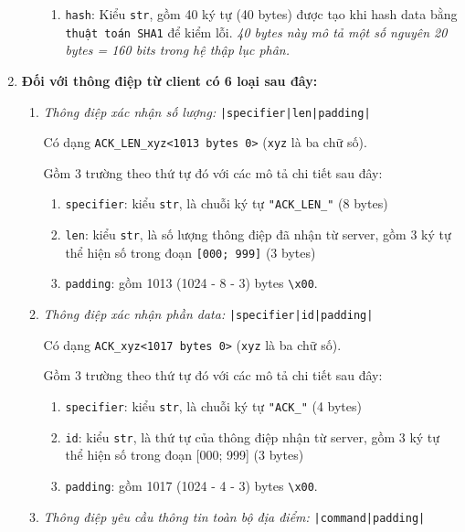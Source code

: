 \begin{enumerate}
\begin{enumerate}
\begin{enumerate}
\item \texttt{hash}: Kiểu \texttt{str}, gồm 40 ký tự (40 bytes) được tạo khi hash data bằng \texttt{thuật toán SHA1} để kiểm lỗi. \textit{40 bytes này mô tả một số nguyên 20 bytes = 160 bits trong hệ thập lục phân.}
\end{enumerate}


\end{enumerate}
\large
\item \textbf{Đối với thông điệp từ client có 6 loại sau đây:}
\normalsize

\begin{enumerate}
\item \textit{Thông điệp xác nhận số lượng:} \texttt{|specifier|len|padding|}

Có dạng \texttt{ACK{\_}LEN{\_}xyz<1013 bytes 0>} (\texttt{xyz} là ba chữ số).

Gồm 3 trường theo thứ tự đó với các mô tả chi tiết sau đây:

\begin{enumerate}
\item \texttt{specifier}: kiểu \texttt{str}, là chuỗi ký tự \texttt{"ACK\_{LEN}\_"} (8 bytes)
\item \texttt{len}: kiểu \texttt{str}, là số lượng thông điệp đã nhận từ server, gồm 3 ký tự thể hiện số trong đoạn \texttt{[000; 999]} (3 bytes)
\item \texttt{padding}: gồm 1013 (1024 - 8 - 3) bytes \texttt{\textbackslash x00}.
\end{enumerate}

\item \textit{Thông điệp xác nhận phần data:} \texttt{|specifier|id|padding|}

Có dạng \texttt{ACK{\_}xyz<1017 bytes 0>} (\texttt{xyz} là ba chữ số).

Gồm 3 trường theo thứ tự đó với các mô tả chi tiết sau đây:

\begin{enumerate}
\item \texttt{specifier}: kiểu \texttt{str}, là chuỗi ký tự \texttt{"ACK{\_}"} (4 bytes)
\item \texttt{id}: kiểu \texttt{str}, là thứ tự của thông điệp nhận từ server, gồm 3 ký tự thể hiện số trong đoạn [000; 999] (3 bytes)
\item \texttt{padding}: gồm 1017 (1024 - 4 - 3) bytes \texttt{\textbackslash x00}.
\end{enumerate}

\item \textit{Thông điệp yêu cầu thông tin toàn bộ địa điểm:} \texttt{|command|padding|}


\end{enumerate}
\end{enumerate}
